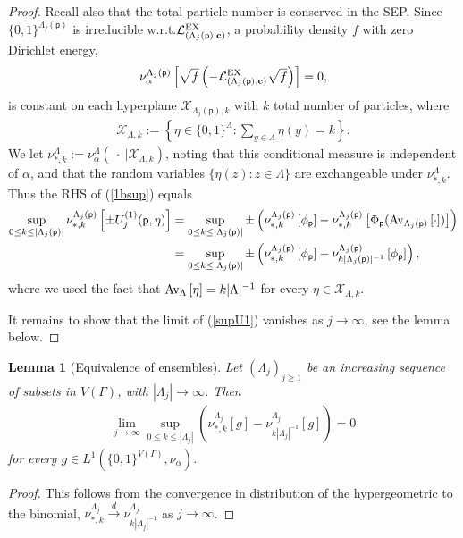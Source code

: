 \documentclass[11pt]{amsart}
\theoremstyle{plain}
\newtheorem{lemma}{Lemma}[section]
\theoremstyle{definition}
\theoremstyle{remark}
\begin{document}
\begin{proof}
Recall also that the total particle number is conserved in the SEP. Since $\{0,1\}^{\Lambda_j({\mathsf{p}})}$ is irreducible w.r.t.\@ $\mathcal{L}^{\rm EX}_{(\Lambda_j({\mathsf{p}}), {\bf c})}$, a probability density $f$ with zero Dirichlet energy,
\begin{align*}
\nu_\alpha^{\Lambda_j({\mathsf{p}})}\left[\sqrt{f}\left(-\mathcal{L}^{\rm EX}_{(\Lambda_j({\mathsf{p}}), {\bf c})}\sqrt{f}\right)\right]=0,
\end{align*}
is constant on each hyperplane $\mathcal{X}_{\Lambda_j({\mathsf{p}}),k}$ with $k$ total number of particles, where 
\begin{align*}
\mathcal{X}_{\Lambda, k} := \left\{\eta\in \{0,1\}^\Lambda: \sum_{y\in \Lambda} \eta(y)=k\right\}.
\end{align*}
We let $\nu^\Lambda_{*,k} := \nu^\Lambda_{\alpha}\left(~\cdot~|\mathcal{X}_{\Lambda, k}\right)$, noting that this conditional measure is independent of $\alpha$, and that the random variables $\{\eta(z): z\in \Lambda\}$ are exchangeable under $\nu^{\Lambda}_{*,k}$. Thus the RHS of (\ref{1bsup}) equals
\begin{align}
\label{supU1}
\sup_{0\leq k\leq |\Lambda_j({\mathsf{p}})|} \nu_{*,k}^{\Lambda_j({\mathsf{p}})} \left[ \pm U^{(1)}_{j}({\mathsf{p}},\eta)\right] &= \sup_{0\leq k\leq |\Lambda_j({\mathsf{p}})|} \pm \left(\nu_{*,k}^{\Lambda_j({\mathsf{p}})}\left[\phi_{\mathsf{p}}\right] - \nu_{*,k}^{\Lambda_j({\mathsf{p}})}\left[\Phi_{\mathsf{p}}({{\rm Av}_{{\Lambda_j({\mathsf{p}})}}\left[{{\cdot}}\right]})\right] \right)\\
\nonumber &= \sup_{0\leq k\leq |\Lambda_j({\mathsf{p}})|} \pm \left(\nu_{*,k}^{\Lambda_j({\mathsf{p}})}\left[\phi_{\mathsf{p}}\right] - \nu_{k|\Lambda_j({\mathsf{p}})|^{-1}}^{\Lambda_j({\mathsf{p}})} \left[\phi_{\mathsf{p}}\right] \right),
\end{align}
where we used the fact that ${{\rm Av}_{{\Lambda}}\left[{{\eta}}\right]} = k|\Lambda|^{-1}$ for every $\eta \in \mathcal{X}_{\Lambda,k}$.

It remains to show that the limit of (\ref{supU1}) vanishes as $j \to\infty$, see the lemma below.
\end{proof}

\begin{lemma}[Equivalence of ensembles]
\label{lem:ensembles}
Let $(\Lambda_j)_{j\geq 1}$ be an increasing sequence of subsets in $V(\Gamma)$, with $|\Lambda_j| \to \infty$. Then
\begin{align}
\label{eq:ensembles}
\lim_{j\to\infty} \sup_{0 \leq k\leq |\Lambda_j|} \left(\nu_{*,k}^{\Lambda_j}[g]-\nu_{k|\Lambda_j|^{-1}}^{\Lambda_j}[g] \right)=0
\end{align}
 for every $g \in L^1(\{0,1\}^{V(\Gamma)}, \nu_\alpha)$.
\end{lemma}
\begin{proof}
This follows from the convergence in distribution of the hypergeometric to the binomial, $\nu^{\Lambda_j}_{*,k} \overset{d}{\to} \nu^{\Lambda_j}_{k|\Lambda_j|^{-1}}$ as $j\to\infty$.
\end{proof}
 
\end{document}
